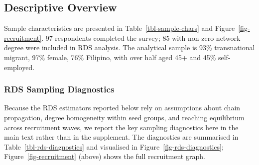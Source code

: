 \documentclass[
  12pt,
  letterpaper,
  DIV=11,
  numbers=noendperiod]{scrartcl}
\begin{document}
\subsection{Descriptive Overview}\label{sec-descriptive}

Sample characteristics are presented in Table~\ref{tbl-sample-chars} and
Figure~\ref{fig-recruitment}. 97 respondents completed the survey; 85
with non-zero network degree were included in RDS analysis. The
analytical sample is 93\% transnational migrant, 97\% female, 76\%
Filipino, with over half aged 45+ and 45\% self-employed.

\subsubsection{RDS Sampling Diagnostics}\label{sec-rds-diagnostics}

Because the RDS estimators reported below rely on assumptions about
chain propagation, degree homogeneity within seed groups, and reaching
equilibrium across recruitment waves, we report the key sampling
diagnostics here in the main text rather than in the supplement. The
diagnostics are summarised in Table~\ref{tbl-rds-diagnostics} and
visualised in Figure~\ref{fig-rds-diagnostics};
Figure~\ref{fig-recruitment} (above) shows the full recruitment graph.
\end{document}
